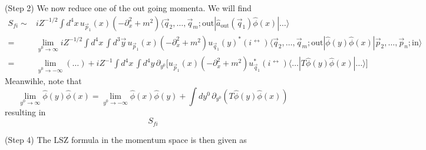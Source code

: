 \begin{thm}
(Step 2) We now reduce one of the out going momenta. We will find
\[\begin{align*}
S_{fi}\sim& iZ^{-1/2}\int d^{4}x\,u_{\vec{p}_{1}}(x)(-\partial _{x}^2+m^2)\langle \vec{q}_{2},\ldots ,\vec{q}_{m};\mathrm{out}|\hat{a}_{\mathrm{out}}(\vec{q}_{1})\hat{\phi }(x)|\ldots \rangle \\
=&\lim _{y^{0}\rightarrow \infty }iZ^{-1/2}\int d^{4}x\,\int d^3\vec{y}\,u_{\vec{p}_{1}}(x)(-\partial _{x}^2+m^2)u_{\vec{q}_{1}}(y)^{*}(i\mathop{\partial_{y^{0}} }^{\leftrightarrow })\langle \vec{q}_{2},\ldots ,\vec{q}_{m};\mathrm{out}|\hat{\phi }(y)\hat{\phi }(x)|\vec{p}_{2},\ldots ,\vec{p}_{n};\mathrm{in}\rangle \\
=&\lim _{y^{0}\rightarrow -\infty }(\ldots )+iZ^{-1}\int d^{4}x\,\int d^{4}y\,\partial _{y^{0}}\Big[u_{\vec{p}_{1}}(x)(-\partial _{x}^2+m^2)u_{\vec{q}_{1}}^{*}(i\mathop{\partial _{y^{0}}}^{\leftrightarrow })\langle \ldots |T\hat{\phi }(y)\hat{\phi }(x)|\ldots \rangle \Big]
\end{align*}\]
Meanwihle, note that 
\[\lim _{y^{0}\rightarrow \infty }\hat{\phi }(y)\hat{\phi }(x)=\lim _{y^{0}\rightarrow -\infty }\hat{\phi }(x)\hat{\phi }(y)+\int dy^{0}\,\partial _{y^{0}}(T\hat{\phi }(y)\hat{\phi }(x))\]
resulting in
\[S_{fi}\]
\bigskip

(Step 4) The LSZ formula in the momentum space is then given as

\end{thm}
\vspace{2ex}


